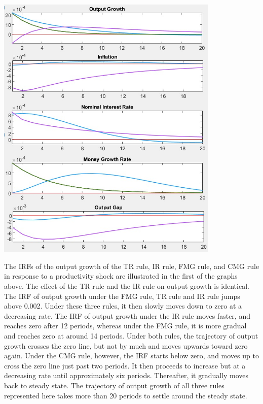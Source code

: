 \documentclass[11pt,preprint, authoryear]{elsarticle}
\let\origfigure\figure
\let\endorigfigure\endfigure
\renewenvironment{figure}[1][2] {
    \expandafter\origfigure\expandafter[H]
} {
    \endorigfigure
}
\numberwithin{equation}{section}
\numberwithin{figure}{section}
\numberwithin{table}{section}
\begin{document}
\begin{figure}
\centering
\includegraphics[width=0.8\textwidth,height=0.6\textheight]{./figures/productivity-shock.jpeg}
\caption{Plots of Impulse Response Functions for a Productivity Shock}
\end{figure}

The IRFs of the output growth of the TR rule, IR rule, FMG rule, and CMG
rule in response to a productivity shock are illustrated in the first of
the graphs above. The effect of the TR rule and the IR rule on output
growth is identical. The IRF of output growth under the FMG rule, TR
rule and IR rule jumps above 0.002. Under these three rules, it then
slowly moves down to zero at a decreasing rate. The IRF of output growth
under the IR rule moves faster, and reaches zero after 12 periods,
whereas under the FMG rule, it is more gradual and reaches zero at
around 14 periods. Under both rules, the trajectory of output growth
crosses the zero line, but not by much and moves upwards toward zero
again. Under the CMG rule, however, the IRF starts below zero, and moves
up to cross the zero line just past two periods. It then proceeds to
increase but at a decreasing rate until approximately six periods.
Thereafter, it gradually moves back to steady state. The trajectory of
output growth of all three rules represented here takes more than 20
periods to settle around the steady state.
\end{document}
